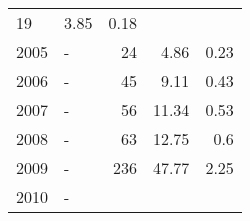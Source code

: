 \begin{longtable}{lXrrr}
       \num{19} &
       \num[round-mode=places,round-precision=2]{3,85} &
         \num[round-mode=places,round-precision=2]{0,18} \\

     2005 &
     \multicolumn{1}{X}{ -  } &


       \num{24} &
       \num[round-mode=places,round-precision=2]{4,86} &
         \num[round-mode=places,round-precision=2]{0,23} \\

     2006 &
     \multicolumn{1}{X}{ -  } &


       \num{45} &
       \num[round-mode=places,round-precision=2]{9,11} &
         \num[round-mode=places,round-precision=2]{0,43} \\

     2007 &
     \multicolumn{1}{X}{ -  } &


       \num{56} &
       \num[round-mode=places,round-precision=2]{11,34} &
         \num[round-mode=places,round-precision=2]{0,53} \\

     2008 &
     \multicolumn{1}{X}{ -  } &


       \num{63} &
       \num[round-mode=places,round-precision=2]{12,75} &
         \num[round-mode=places,round-precision=2]{0,6} \\

     2009 &
     \multicolumn{1}{X}{ -  } &


       \num{236} &
       \num[round-mode=places,round-precision=2]{47,77} &
         \num[round-mode=places,round-precision=2]{2,25} \\

     2010 &
     \multicolumn{1}{X}{ -  } &



\end{longtable}
